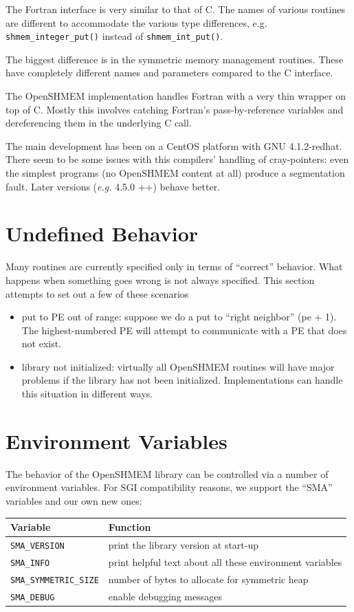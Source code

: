 \documentclass[english]{article}
\providecommand{\tabularnewline}{\\}
\begin{document}
The Fortran interface is very similar to that of C. The names of various
routines are different to accommodate the various type differences,
e.g. \texttt{shmem\_integer\_put()} instead of \texttt{shmem\_int\_put()}.

The biggest difference is in the symmetric memory management routines.
These have completely different names and parameters compared to the
C interface.

The OpenSHMEM implementation handles Fortran with a very thin wrapper
on top of C. Mostly this involves catching Fortran's pass-by-reference
variables and dereferencing them in the underlying C call.

The main development has been on a CentOS platform with GNU 4.1.2-redhat.
There seem to be some issues with this compilers' handling of cray-pointers:
even the simplest programs (no OpenSHMEM content at all) produce a
segmentation fault. Later versions (\emph{e.g. }4.5.0 ++) behave better.


\section{Undefined Behavior}

Many routines are currently specified only in terms of {}``correct''
behavior. What happens when something goes wrong is not always specified.
This section attempts to set out a few of these scenarios
\begin{itemize}
\item put to PE out of range: suppose we do a put to {}``right neighbor''
(pe + 1). The highest-numbered PE will attempt to communicate with
a PE that does not exist.
\item library not initialized: virtually all OpenSHMEM routines will have
major problems if the library has not been initialized. Implementations
can handle this situation in different ways.
\end{itemize}

\section{Environment Variables\label{sec:Environment-Variables}}

The behavior of the OpenSHMEM library can be controlled via a number
of environment variables. For SGI compatibility reasons, we support
the {}``SMA'' variables and our own new ones:

\medskip{}


\begin{tabular}{|l|l|}
\hline 
Variable & Function\tabularnewline
\hline
\hline 
\texttt{SMA\_VERSION} & print the library version at start-up\tabularnewline
\hline 
\texttt{SMA\_INFO} & print helpful text about all these environment variables\tabularnewline
\hline 
\texttt{SMA\_SYMMETRIC\_SIZE} & number of bytes to allocate for symmetric heap\tabularnewline
\hline 
\texttt{SMA\_DEBUG} & enable debugging messages\tabularnewline
\hline
\end{tabular}
\end{document}
